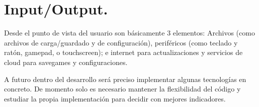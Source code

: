 
\section{Input/Output.}\label{io:input-output}


Desde el punto de vista del usuario son básicamente 3 elementos: Archivos (como archivos de carga/guardado y de configuración), periféricos (como teclado y ratón, gamepad, o touchscreen); e internet para actualizaciones y servicios de cloud para savegames y configuraciones.

A futuro dentro del desarrollo será preciso implementar algunas tecnologías en concreto. De momento solo es necesario mantener la flexibilidad del código y estudiar la propia implementación para decidir con mejores indicadores.